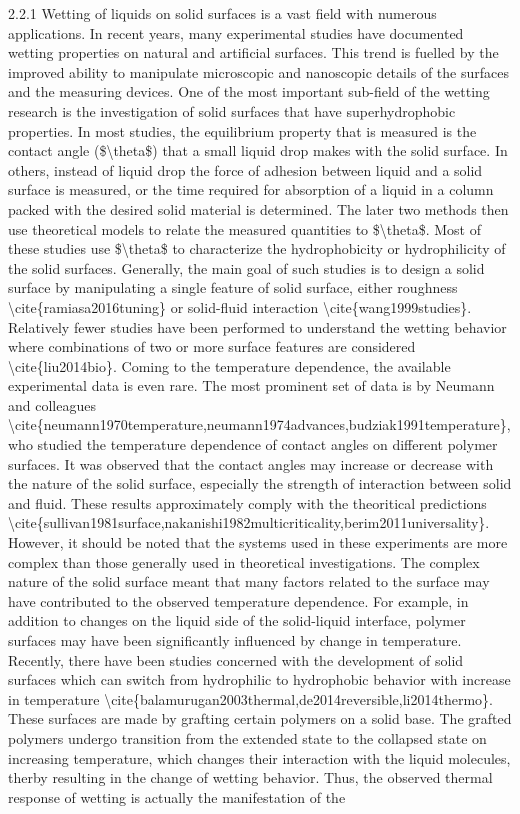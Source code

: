 \par 2.2.1 Wetting of liquids on solid surfaces is a vast field with numerous applications. In recent years, many experimental studies have documented wetting properties on natural and artificial surfaces. This trend is fuelled by the improved ability to manipulate microscopic and nanoscopic details of the surfaces and the measuring devices. One of the most important sub-field of the wetting research is the investigation of solid surfaces that have superhydrophobic properties. In most studies, the equilibrium property that is measured is the contact angle (\$\textbackslash theta\$) that a small liquid drop makes with the solid surface. In others, instead of liquid drop the force of adhesion between liquid and a solid surface is measured, or the time required for absorption of a liquid in a column packed with the desired solid material is determined. The later two methods then use theoretical models to relate the measured quantities to \$\textbackslash theta\$. Most of these studies use \$\textbackslash theta\$ to characterize the hydrophobicity or hydrophilicity of the solid surfaces. Generally, the main goal of such studies is to design a solid surface by manipulating a single feature of solid surface, either roughness \textbackslash cite\{ramiasa2016tuning\} or solid-fluid interaction \textbackslash cite\{wang1999studies\}. Relatively fewer studies have been performed to understand the wetting behavior where combinations of two or more surface features are considered \textbackslash cite\{liu2014bio\}. Coming to the temperature dependence, the available experimental data is even rare. The most prominent set of data is by Neumann and colleagues \textbackslash cite\{neumann1970temperature,neumann1974advances,budziak1991temperature\}, who studied the temperature dependence of contact angles on different polymer surfaces. It was observed that the contact angles may increase or decrease with the nature of the solid surface, especially the strength of interaction between solid and fluid. These results approximately comply with the theoritical predictions \textbackslash cite\{sullivan1981surface,nakanishi1982multicriticality,berim2011universality\}. However, it should be noted that the systems used in these experiments are more complex than those generally used in theoretical investigations. The complex nature of the solid surface meant that many factors related to the surface may have contributed to the observed temperature dependence. For example, in addition to changes on the liquid side of the solid-liquid interface, polymer surfaces may have been significantly influenced by change in temperature.  Recently, there have been studies concerned with the development of solid surfaces which can switch from hydrophilic to hydrophobic behavior with increase in temperature \textbackslash cite\{balamurugan2003thermal,de2014reversible,li2014thermo\}. These surfaces are made by grafting certain polymers on a solid base. The grafted polymers undergo transition from the extended state to the collapsed state on increasing temperature, which changes their interaction with the liquid molecules, therby resulting in the change of wetting behavior. Thus, the observed thermal response of wetting is actually the manifestation of the 